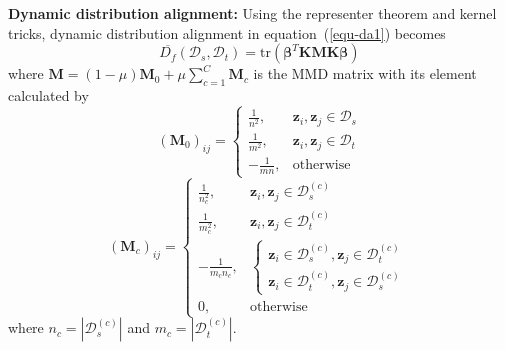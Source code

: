 \documentclass[sigconf]{acmart}
\begin{document}
\textbf{Dynamic distribution alignment: }
Using the representer theorem and kernel tricks, dynamic distribution alignment in equation~(\ref{equ-da1}) becomes
\begin{equation}
	\label{equ-da}
	\overline{D_{f}}(\mathcal{D}_s,\mathcal{D}_t)=\mathrm{tr} \left(\bm{\beta}^T \mathbf{K} \mathbf{M} \mathbf{K} \bm{\beta} \right)
\end{equation}
where $\mathbf{M}=(1-\mu)\mathbf{M}_0 + \mu \sum_{c=1}^{C} \mathbf{M}_c$ is the MMD matrix with its element calculated by
\begin{equation}
	\label{equ-mo}
	(\mathbf{M}_0)_{ij}=\begin{cases}
		\frac{1}{n^2},  & \mathbf{z}_i,\mathbf{z}_j \in \mathcal{D}_s\\ 
		\frac{1}{m^2}, & \mathbf{z}_i,\mathbf{z}_j \in \mathcal{D}_t\\ 
		-\frac{1}{mn}, & \text{otherwise} 
	\end{cases}
\end{equation}
\begin{equation}
	\label{equ-mc}
	(\mathbf{M}_c)_{ij}=\begin{cases}
		\frac{1}{n^2_c},  & \mathbf{z}_i,\mathbf{z}_j \in \mathcal{D}^{(c)}_s\\ 
		\frac{1}{m^2_c}, & \mathbf{z}_i,\mathbf{z}_j \in \mathcal{D}^{(c)}_t\\ 
		-\frac{1}{m_c n_c}, & \begin{cases}
			\mathbf{z}_i \in \mathcal{D}^{(c)}_s ,\mathbf{z}_j \in \mathcal{D}^{(c)}_t \\ 
			\mathbf{z}_i \in \mathcal{D}^{(c)}_t ,\mathbf{z}_j \in \mathcal{D}^{(c)}_s
		\end{cases}\\
		0, & \text{otherwise}
	\end{cases}
\end{equation}
where $n_c=|\mathcal{D}^{(c)}_s|$ and $m_c=|\mathcal{D}^{(c)}_t|$.
\end{document}
